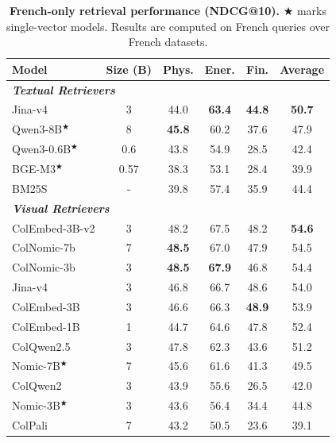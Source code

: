 \begin{table}[htbp]
\small
\centering
\begin{tabular}{l c c c c >{\columncolor{avgcol}}c}
\toprule
\textbf{Model} & Size (B) & Phys. & Ener. & Fin. & \textbf{Average} \\
\midrule
\multicolumn{5}{l}{\textit{\textbf{Textual Retrievers}}} \\
Jina-v4	& 3 & 44.0	& \textbf{63.4}	& \textbf{44.8} & \textbf{50.7}\\
Qwen3-8B$^\bigstar$	& 8 &\textbf{45.8}	& 60.2	& 37.6& 47.9\\
Qwen3-0.6B$^\bigstar$	& 0.6 & 43.8	& 54.9	& 28.5& 42.4\\
BGE-M3$^\bigstar$ &0.57	& 38.3	& 53.1	& 28.4&39.9\\
BM25S	& - & 39.8	& 57.4	& 35.9 & 44.4\\
\midrule
\multicolumn{5}{l}{\textit{\textbf{Visual Retrievers}}} \\
ColEmbed-3B-v2 & 3 & 48.2 & 67.5 & 48.2 & \textbf{54.6}\\
ColNomic-7b	& 7 & \textbf{48.5} & 67.0	& 47.9 & 54.5\\
ColNomic-3b	& 3 & \textbf{48.5} &	\textbf{67.9} &	46.8 & 54.4\\
Jina-v4	& 3 & 46.8	& 66.7 & 48.6 & 54.0 \\
ColEmbed-3B & 	3 & 46.6 &	66.3 &	\textbf{48.9} & 53.9\\
ColEmbed-1B & 1 & 44.7 &	64.6 &	47.8 & 52.4\\
ColQwen2.5 &	3 & 47.8	&62.3	&43.6& 51.2\\
Nomic-7B$^\bigstar$ &	7 & 45.6&	61.6&	41.3 & 49.5\\
ColQwen2	& 3 & 43.9	&55.6	&26.5& 42.0\\
Nomic-3B$^\bigstar$	& 3 & 43.6	&56.4	&34.4 & 44.8\\
ColPali	& 7 & 43.2	&50.5	&23.6 & 39.1 \\
\bottomrule
\end{tabular}
\caption[French-only retrieval performance]{\textbf{French-only retrieval performance (NDCG@10).} $\bigstar$ marks single-vector models. Results are computed on French queries over French datasets.}
\label{vidorev3:tab: french-only retrieval}
\end{table}


